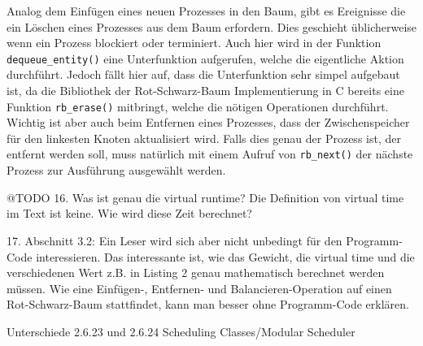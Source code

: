 Analog dem Einfügen eines neuen Prozesses in den Baum, gibt es Ereignisse die ein Löschen eines Prozesses aus dem Baum erfordern. Dies geschieht üblicherweise wenn ein Prozess blockiert oder terminiert. Auch hier wird in der Funktion \texttt{dequeue\_entity()} eine Unterfunktion aufgerufen, welche die eigentliche Aktion durchführt. Jedoch fällt hier auf, dass die Unterfunktion sehr simpel aufgebaut ist, da die Bibliothek der Rot-Schwarz-Baum Implementierung in C bereits eine Funktion \texttt{rb\_erase()} mitbringt, welche die nötigen Operationen durchführt. Wichtig ist aber auch beim Entfernen eines Prozesses, dass der Zwischenspeicher für den linkesten Knoten aktualisiert wird. Falls dies genau der Prozess ist, der entfernt werden soll, muss natürlich mit einem Aufruf von \texttt{rb\_next()} der nächste Prozess zur Ausführung ausgewählt werden. 

@TODO
16. Was ist genau die virtual runtime? Die Definition von virtual time im Text ist keine. Wie wird diese Zeit berechnet?

17. Abschnitt 3.2: Ein Leser wird sich aber nicht unbedingt für den Programm-Code interessieren. Das interessante ist, wie das Gewicht, die virtual time und die verschiedenen Wert z.B. in Listing 2 genau mathematisch berechnet werden müssen. Wie eine Einfügen-, Entfernen- und Balancieren-Operation auf einen Rot-Schwarz-Baum stattfindet, kann man besser ohne Programm-Code erklären. 

Unterschiede 2.6.23 und 2.6.24 \cite{cpabla}
Scheduling Classes/Modular Scheduler
